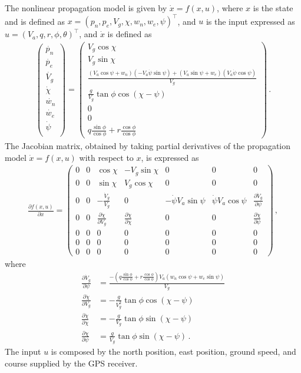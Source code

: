 The nonlinear propagation model is given by $\dot{x}=f(x,u)$, where $x$ is the state and is defined as $x=(p_n,p_e,V_g,\chi,w_n,w_e,\psi)^\top$, and $u$ is the input expressed as $u=(V_a,q,r,\phi,\theta)^\top$, and $\dot{x}$ is defined as
\begin{align}
\begin{pmatrix}
\dot{p_n} \\
\dot{p_e} \\
\dot{V_g} \\
\dot{\chi} \\
\dot{w_n} \\
\dot{w_e} \\
\dot{\psi} \\
\end{pmatrix}
= 
\begin{pmatrix}
V_g\cos\chi \\
V_g\sin\chi \\
\frac{(V_a\cos\psi+w_n)(-V_a\dot{\psi}\sin\psi)+(V_a\sin\psi+w_e)(V_a\dot{\psi}\cos\psi)}{V_g} \\
\frac{g}{V_g}\tan\phi\cos(\chi-\psi) \\
0 \\
0 \\
q\frac{\sin\phi}{\cos\phi}+r\frac{\cos\phi}{\cos\phi}
\end{pmatrix}\,.
\end{align}
The Jacobian matrix, obtained by taking partial derivatives of the propagation model $\dot{x}=f(x,u)$ with respect to $x$, is expressed as
\begin{align}
\frac{\partial f(x,u)}{\partial x}=
\begin{pmatrix}
0 & 0 & \cos\chi & -V_g\sin\chi & 0 & 0 & 0 \\
0 & 0 & \sin\chi & V_g\cos\chi  & 0 & 0 & 0 \\
0 & 0 & -\frac{\dot{V}_g}{V_g} & 0 & -\dot{\psi}V_a\sin\psi & \dot{\psi}V_a\cos\psi & \frac{\partial \dot{V}_g}{\partial \psi} \\
0 & 0 & \frac{\partial \dot{\chi}}{\partial V_g} & \frac{\partial \dot{\chi}}{\partial \chi} & 0 & 0 & \frac{\partial \dot{\chi}}{\partial \psi} \\
0 & 0 & 0& 0 & 0 & 0 & 0 \\
0 & 0 & 0& 0 & 0 & 0 & 0 \\
0 & 0 & 0& 0 & 0 & 0 & 0
\end{pmatrix}\,,
\end{align}
where
\begin{align*}
\frac{\partial\dot{V}_g}{\partial\psi}&= \frac{-\left(q\frac{\sin\phi}{\cos\phi}+r\frac{\cos\phi}{\cos\phi}\right)V_a(w_n\cos\psi+w_e\sin\psi)}{V_g} \\
\frac{\partial\dot{\chi}}{\partial V_g}&= -\frac{g}{V_g^2}\tan\phi\cos(\chi-\psi) \\
\frac{\partial\dot{\chi}}{\partial\chi} &= -\frac{g}{V_g}\tan\phi\sin(\chi-\psi) \\
\frac{\partial\chi}{\partial\psi} &= \frac{g}{V_g}\tan\phi\sin(\chi-\psi)\,.
\end{align*}
The input $u$ is composed by the north position, east position, ground speed, and course supplied by the GPS receiver. 

